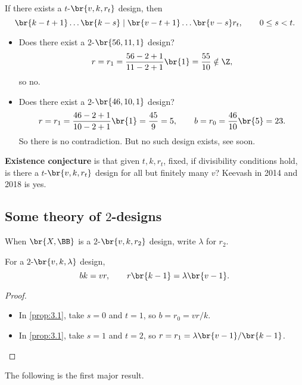 \begin{corollary}
If there exists a $ t $-$ \br{v, k, r_t} $ design, then
$$ \br{k - t + 1} \dots \br{k - s} \mid \br{v - t + 1} \dots \br{v - s}r_t, \qquad 0 \le s < t. $$
\end{corollary}

\begin{example*}
\hfill
\begin{itemize}
\item Does there exist a $ 2 $-$ \br{56, 11, 1} $ design?
$$ r = r_1 = \dfrac{56 - 2 + 1}{11 - 2 + 1}\br{1} = \dfrac{55}{10} \notin \Z, $$
so no.
\item Does there exist a $ 2 $-$ \br{46, 10, 1} $ design?
$$ r = r_1 = \dfrac{46 - 2 + 1}{10 - 2 + 1}\br{1} = \dfrac{45}{9} = 5, \qquad b = r_0 = \dfrac{46}{10}\br{5} = 23. $$
So there is no contradiction. But no such design exists, see soon.
\end{itemize}
\end{example*}

\textbf{Existence conjecture} is that given $ t, k, r_t $, fixed, if divisibility conditions hold, is there a $ t $-$ \br{v, k, r_t} $ design for all but finitely many $ v $? Keevash in 2014 and 2018 is yes.

\pagebreak

\subsection{Some theory of \texorpdfstring{$ 2 $}{2}-designs}

When $ \br{X, \BB} $ is a $ 2 $-$ \br{v, k, r_2} $ design, write $ \lambda $ for $ r_2 $.

\begin{proposition}
For a $ 2 $-$ \br{v, k, \lambda} $ design,
$$ bk = vr, \qquad r\br{k - 1} = \lambda\br{v - 1}. $$
\end{proposition}

\begin{proof}
\hfill
\begin{itemize}
\item In \ref{prop:3.1}, take $ s = 0 $ and $ t = 1 $, so $ b = r_0 = vr / k $.
\item In \ref{prop:3.1}, take $ s = 1 $ and $ t = 2 $, so $ r = r_1 = \lambda\br{v - 1} / \br{k - 1} $.
\end{itemize}
\end{proof}

The following is the first major result.

